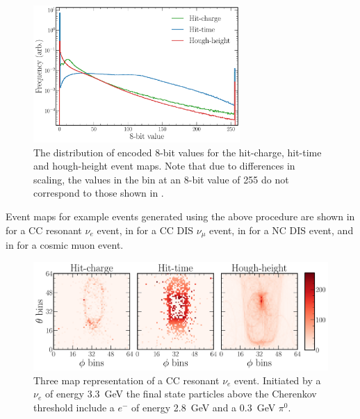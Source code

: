 \begin{figure} %
    \includegraphics[width=0.7\textwidth]{diagrams/7-results/explore_8_bit_range.pdf}
    \caption[Event map encoded 8-bit distributions]
    {The distribution of encoded 8-bit values for the hit-charge, hit-time and hough-height event
        maps. Note that due to differences in scaling, the values in the bin at an 8-bit value of
        255 do not correspond to those shown in .}
    \label{fig:explore_8_bit_range}
\end{figure}

Event maps for example events generated using the above procedure are shown in
 for a CC resonant $\nu_{e}$ event, in
 for a CC DIS $\nu_{\mu}$ event, in
 for a NC DIS event, and in
 for a cosmic muon event.

\begin{figure} %
    \includegraphics[width=\textwidth]{diagrams/7-results/explore_nuel_ccres_event.pdf}
    \caption[Example of a CC resonant $\nu_{e}$ event]
    {Three map representation of a CC resonant $\nu_{e}$ event. Initiated by a $\nu_{e}$ of energy
        \SI{3.3}{\GeV} the final state particles above the Cherenkov threshold include a $e^{-}$
        of energy \SI{2.8}{\GeV} and a \SI{0.3}{\GeV} $\pi^{0}$.}
    \label{fig:explore_nuel_ccres_event}
\end{figure}

